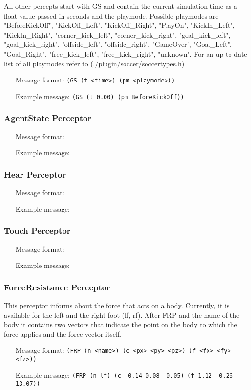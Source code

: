 All other percepts start with GS and contain the current simulation time as a
float value passed in seconds and the playmode. Possible
playmodes are "BeforeKickOff", "KickOff\_Left", "KickOff\_Right",
"PlayOn", "KickIn\_Left", "KickIn\_Right", "corner\_kick\_left",
"corner\_kick\_right", "goal\_kick\_left", "goal\_kick\_right",
"offside\_left", "offside\_right", "GameOver", "Goal\_Left",
"Goal\_Right", "free\_kick\_left", "free\_kick\_right", "unknown". For an
up to date list of all playmodes refer to (./plugin/soccer/soccertypes.h)

\begin{itemize}
	\item[Message format:] \texttt{(GS (t <time>) (pm <playmode>))}
	\item[Example message:] \texttt{(GS (t 0.00) (pm BeforeKickOff))}
\end{itemize}

\subsubsection{AgentState Perceptor}
\begin{itemize}
	\item[Message format:] \texttt{}
	\item[Example message:] \texttt{}
\end{itemize}
\subsubsection{Hear Perceptor}
\begin{itemize}
	\item[Message format:] \texttt{}
	\item[Example message:] \texttt{}
\end{itemize}
\subsubsection{Touch Perceptor}
\begin{itemize}
	\item[Message format:] \texttt{}
	\item[Example message:] \texttt{}
\end{itemize}
\subsubsection{ForceResistance Perceptor}
This perceptor informs about the force that acts on a body. Currently, it is
available for the left and the right foot (lf, rf).
After FRP and the name of the body it contains two vectors that indicate the
point on the body to which the force applies and the force vector itself.
\begin{itemize}
	\item[Message format:] \texttt{(FRP (n <name>) (c <px> <py> <pz>) (f <fx> <fy>
	<fz>))}
	\item[Example message:] \texttt{(FRP (n lf) (c -0.14 0.08 -0.05) (f 1.12 -0.26
	13.07))}
\end{itemize}

